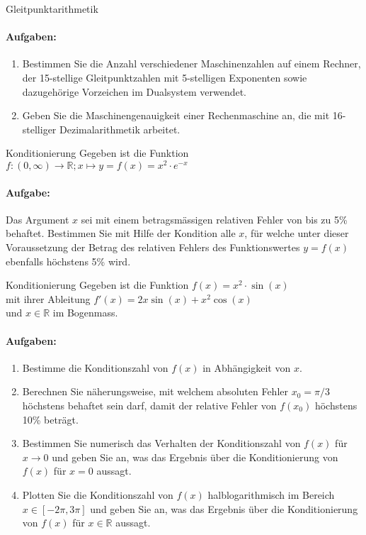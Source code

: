 \begin{example2}{Gleitpunktarithmetik}
\paragraph{Aufgaben:}
\begin{enumerate}
    \item Bestimmen Sie die Anzahl verschiedener Maschinenzahlen auf einem Rechner, der 15-stellige Gleitpunktzahlen mit 5-stelligen Exponenten sowie dazugehörige Vorzeichen im Dualsystem verwendet.
    
    \item Geben Sie die Maschinengenauigkeit einer Rechenmaschine an, die mit 16-stelliger Dezimalarithmetik arbeitet.
\end{enumerate}
\end{example2}

\begin{example2}{Konditionierung}
Gegeben ist die Funktion
$f: (0,\infty) \rightarrow \mathbb{R}; x \mapsto y = f(x) = x^2 \cdot e^{-x}$

\paragraph{Aufgabe:}
Das Argument $x$ sei mit einem betragsmässigen relativen Fehler von bis zu 5\% behaftet. Bestimmen Sie mit Hilfe der Kondition alle $x$, für welche unter dieser Voraussetzung der Betrag des relativen Fehlers des Funktionswertes $y = f(x)$ ebenfalls höchstens 5\% wird.
\end{example2}

\begin{example2}{Konditionierung}
Gegeben ist die Funktion
$f(x) = x^2 \cdot \sin(x)$\\
mit ihrer Ableitung
$f'(x) = 2x\sin(x) + x^2\cos(x)$\\
und $x \in \mathbb{R}$ im Bogenmass.

\paragraph{Aufgaben:}
\begin{enumerate}
    \item Bestimme die Konditionszahl von $f(x)$ in Abhängigkeit von $x$.
    \item Berechnen Sie näherungsweise, mit welchem absoluten Fehler $x_0 = \pi/3$ höchstens behaftet sein darf, damit der relative Fehler von $f(x_0)$ höchstens 10\% beträgt.
    \item Bestimmen Sie numerisch das Verhalten der Konditionszahl von $f(x)$ für $x \to 0$ und geben Sie an, was das Ergebnis über die Konditionierung von $f(x)$ für $x = 0$ aussagt.
    \item Plotten Sie die Konditionszahl von $f(x)$ halblogarithmisch im Bereich $x \in [-2\pi, 3\pi]$ und geben Sie an, was das Ergebnis über die Konditionierung von $f(x)$ für $x \in \mathbb{R}$ aussagt.
\end{enumerate}
\end{example2}

